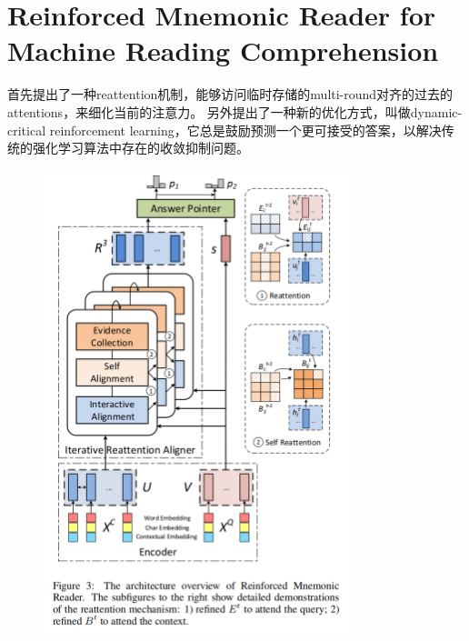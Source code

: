 \documentclass[a4paper,UTF8]{article}
\numberwithin{equation}{section}
\begin{document}
\newpage
\section{Reinforced Mnemonic Reader for Machine Reading Comprehension}
首先提出了一种reattention机制，能够访问临时存储的multi-round对齐的过去的attentions，来细化当前的注意力。
另外提出了一种新的优化方式，叫做dynamic-critical reinforcement learning，它总是鼓励预测一个更可接受的答案，以解决传统的强化学习算法中存在的收敛抑制问题。
\begin{figure}[H]
	\centering
	\includegraphics[width=0.8\textwidth]{14-1.png}
\end{figure}
\end{document}

